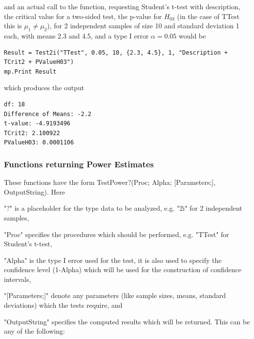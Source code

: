 \vspace{0.3cm}
and an actual call to the function, requesting Student's t-test with description, the critical value for a two-sided test, the p-value for $H_{03}$ (in the case of \textsf{TTest} this is $\mu_1 \neq \mu_2$), for 2 independent samples of size 10 and standard deviation 1 each, with means 2.3 and 4.5, and a type I error $\alpha=0.05$ would be

\begin{lstlisting}
Result = Test2i("TTest", 0.05, 10, {2.3, 4.5}, 1, "Description + TCrit2 + PValueH03")
mp.Print Result
\end{lstlisting}
which produces the output

\begin{verbatim}
df: 18
Difference of Means: -2.2
t-value: -4.9193496
TCrit2: 2.100922
PValueH03: 0.0001106
\end{verbatim}




\newpage
\subsubsection{Functions returning Power Estimates}
\label{Functions returning Power Estimates}
These functions have the form \textsf{TestPower?(Proc; Alpha; [Parameters;], OutputString)}.
Here 

"?" is a placeholder for the type data to be analyzed, e.g. "2i" for 2 independent samples, 

"Proc" specifies the procedures which should be performed, e.g. "TTest" for Student's t-test, 

"Alpha" is the type I error used for the test, it is also used to specify the confidence level (1-Alpha) which will be used for the construction of confidence intervals, 


"[Parameters;]" denote any parameters (like sample sizes, means, standard deviations) which the tests require, and 

"OutputString" specifies the computed results which will be returned. This can be any of the following:

